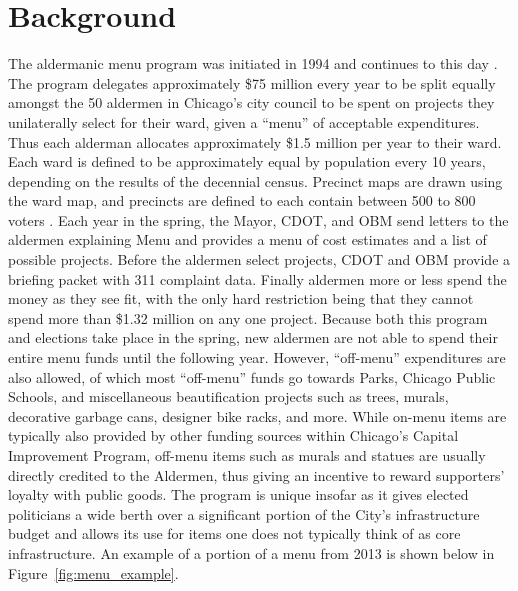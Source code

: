 \section{Background}\label{sec:background}

The aldermanic menu program was initiated in 1994 and continues to this day \cite{OIGaudit}. 
The program delegates approximately \$75 million every year to be split equally amongst the 50 aldermen in Chicago's city council to be spent on projects they unilaterally select for their ward, given a ``menu'' of acceptable expenditures. 
Thus each alderman allocates approximately \$1.5 million per year to their ward.
Each ward is defined to be approximately equal by population every 10 years, depending on the results of the decennial census.
Precinct maps are drawn using the ward map, and precincts are defined to each contain between 500 to 800 voters \cite{Crowley_2022}.
Each year in the spring, the Mayor, CDOT, and OBM send letters to the aldermen explaining Menu and provides a menu of cost estimates and a list of possible projects.
Before the aldermen select projects, CDOT and OBM provide a briefing packet with 311 complaint data.
Finally aldermen more or less spend the money as they see fit, with the only hard restriction being that they cannot spend more than \$1.32 million on any one project.
Because both this program and elections take place in the spring, new aldermen are not able to spend their entire menu funds until the following year.
However, ``off-menu'' expenditures are also allowed, of which most ``off-menu'' funds go towards Parks, Chicago Public Schools, and miscellaneous beautification projects such as trees, murals, decorative garbage cans, designer bike racks, and more\cite{OIGaudit}. 
While on-menu items are typically also provided by other funding sources within Chicago's Capital Improvement Program, off-menu items such as murals and statues are usually directly credited to the Aldermen, thus giving an incentive to reward supporters' loyalty with public goods.
The program is unique insofar as it gives elected politicians a wide berth over a significant portion of the City's infrastructure budget and allows its use for items one does not typically think of as core infrastructure. 
An example of a portion of a menu from 2013 is shown below in Figure~\ref*{fig:menu_example}.


